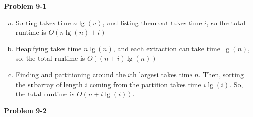 \documentclass{article}
\begin{document}
\noindent\textbf{ Problem 9-1} \\
\begin{enumerate}[a.]
\item
Sorting takes time $n\lg(n)$, and listing them out takes time $i$, so the total runtime is $O(n\lg(n)+i)$

\item
Heapifying takes time $n\lg(n)$, and each extraction can take time $\lg(n)$, so, the total runtime is $O((n+i)\lg(n))$ 

\item
Finding and partitioning around the $i$th largest takes time $n$. Then, sorting the subarray of length $i$ coming from the partition takes time $i\lg(i)$. So, the total runtime is $O(n+i\lg(i))$.

\end{enumerate}

\noindent\textbf{Problem 9-2} \\
\end{document}
